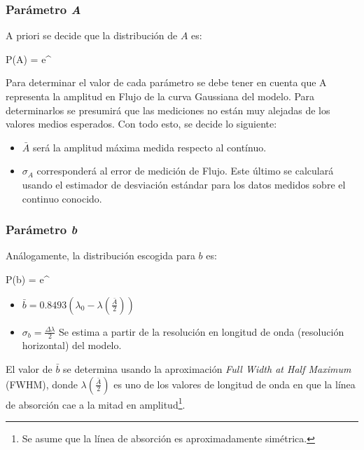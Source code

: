 \documentclass{article}
\begin{document}
\subsubsection{Parámetro \emph{A}}
A priori se decide que la distribución de $A$ es:

\begin{myequation}
P(A) =  e^{}
\label{ec:distr_A}
\end{myequation}

Para determinar el valor de cada parámetro se debe tener en cuenta que A representa la amplitud en Flujo de la curva Gaussiana del modelo. Para determinarlos se presumirá que las mediciones no están muy alejadas de los valores medios esperados. Con todo esto, se decide lo siguiente:

\begin{itemize}
\item $\bar A$ será la amplitud máxima medida respecto al contínuo.

\item $\sigma_A$ corresponderá al error de medición de Flujo. Este último se calculará usando el estimador de desviación estándar para los datos medidos sobre el continuo conocido.
\end{itemize}

\subsubsection{Parámetro \emph{b}}
Análogamente, la distribución escogida para $b$ es:

\begin{myequation}
P(b) =  e^{}
\end{myequation}

\begin{itemize}
\item $\bar b = 0.8493(\lambda_0 - \lambda(\frac{\bar A}{2}))$

\item $\sigma_b = \frac{\Delta \lambda}{2}$ Se estima a partir de la resolución en longitud de onda (resolución horizontal) del modelo.
\end{itemize}

El valor de $\bar b$ se determina usando la aproximación \emph{Full Width at Half Maximum} (FWHM), donde $\lambda(\frac{\bar A}{2})$ es uno de los valores de longitud de onda en que la línea de absorción cae a la mitad en amplitud\footnote{ Se asume que la línea de absorción es aproximadamente simétrica.}.
\end{document}
